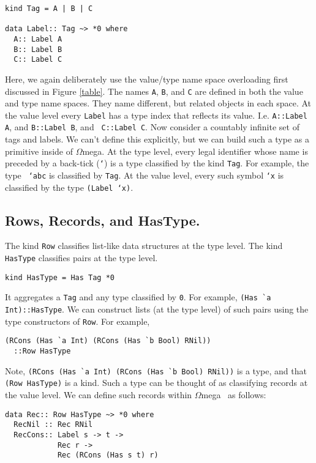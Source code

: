 \documentclass{sigplanconf}
\newcommand{\om}{$\Omega$mega}
\begin{document}
\begin{verbatim}
kind Tag = A | B | C

data Label:: Tag ~> *0 where
  A:: Label A
  B:: Label B
  C:: Label C
\end{verbatim}

Here, we again deliberately use the value/type name space
overloading first discussed in Figure \ref{table}. The names {\tt A}, {\tt B}, and {\tt C} 
are defined in both the value and type name spaces. They 
name different,
but related objects in each space.
At the value level every {\tt Label} has a type index
that reflects its value. I.e. {\tt A::Label A}, and {\tt B::Label B}, and {\tt
C::Label C}. Now consider a countably infinite set of tags and labels. We can't
define this explicitly, but we can build such a type as a primitive inside of
\om. At the type level, every legal identifier whose name is preceded by a
back-tick ({\tt `}) is a type classified by the kind {\tt Tag}. For example, the type {\tt
`abc} is classified by {\tt Tag}. At the value level, every such symbol {\tt `x} is classified
by the type {\tt (Label `x)}.

\subsection{Rows, Records, and HasType.}

The kind {\tt Row} classifies list-like data structures at the type level.
The kind {\tt HasType} classifies pairs at the type level. 
\begin{verbatim}
kind HasType = Has Tag *0
\end{verbatim}
It aggregates
a {\tt Tag} and any type classified by {\tt *0}. For example, \verb+(Has `a Int)::HasType+.
We can construct lists (at the type level) of such pairs using the type constructors of {\tt Row}.
For example,
\begin{verbatim}
(RCons (Has `a Int) (RCons (Has `b Bool) RNil))
  ::Row HasType
\end{verbatim}
Note, \verb+(RCons (Has `a Int) (RCons (Has `b Bool) RNil))+ is a type,
and that \verb+(Row HasType)+ is a kind.
Such a type can be thought of as classifying records at the value
level. We can define such records within \om~ as follows:

\begin{verbatim}
data Rec:: Row HasType ~> *0 where
  RecNil :: Rec RNil
  RecCons:: Label s -> t -> 
            Rec r -> 
            Rec (RCons (Has s t) r)
\end{verbatim}
\end{document}
